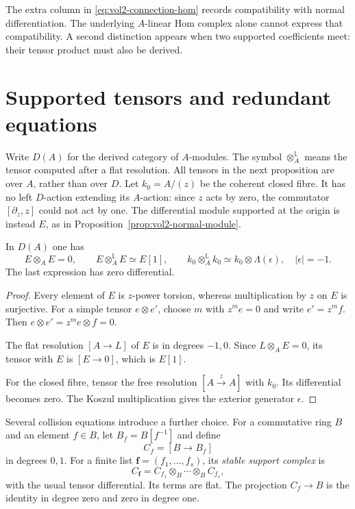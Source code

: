 The extra column in \eqref{eq:vol2-connection-hom} records compatibility
with normal differentiation. The underlying $A$-linear Hom complex
alone cannot express that compatibility. A second distinction appears
when two supported coefficients meet: their tensor product must also
be derived.

\section{Supported tensors and redundant equations}
\label{sec:vol2-supported-tensors}

Write $D(A)$ for the derived category of $A$-modules. The symbol
$\otimes_A^{\mathbb L}$ means the tensor computed after a flat
resolution. All tensors in the next proposition are over $A$, rather
than over $D$. Let $k_0=A/(z)$ be the coherent closed fibre.
It has no left $D$-action extending its $A$-action: since $z$ acts
by zero, the commutator $[\partial_z,z]$ could not act by one.
The differential module supported at the origin is instead $E$,
as in Proposition~\ref{prop:vol2-normal-module}.

\begin{proposition}\label{prop:vol2-supported-self-tensor}
In $D(A)$ one has
\begin{equation}\label{eq:vol2-supported-self-tensor}
 E\otimes_AE=0,\qquad E\otimes_A^{\mathbb L}E\simeq E[1],
 \qquad
 k_0\otimes_A^{\mathbb L}k_0\simeq k_0\otimes\Lambda(\epsilon),
 \quad |\epsilon|=-1.
\end{equation}
The last expression has zero differential.
\end{proposition}

\begin{proof}
Every element of $E$ is $z$-power torsion, whereas multiplication by
$z$ on $E$ is surjective. For a simple tensor $e\otimes e'$,
choose $m$ with $z^me=0$ and write $e'=z^mf$. Then
$e\otimes e'=z^me\otimes f=0$.

The flat resolution $[A\to L]$ of $E$ is in degrees $-1,0$.
Since $L\otimes_AE=0$, its tensor with $E$ is $[E\to0]$,
which is $E[1]$.

For the closed fibre, tensor the free resolution
$[A\xrightarrow{z}A]$ with $k_0$. Its differential becomes zero.
The Koszul multiplication gives the exterior generator $\epsilon$.
\end{proof}

Several collision equations introduce a further choice. For a
commutative ring $B$ and an element $f\in B$, let
$B_f=B[f^{-1}]$ and define
\[
 C_f=[B\longrightarrow B_f]
\]
in degrees $0,1$. For a finite list $\mathbf f=(f_1,\ldots,f_s)$,
its \emph{stable support complex} is
\begin{equation}\label{eq:vol2-stable-support}
 C_{\mathbf f}=C_{f_1}\otimes_B\cdots\otimes_B C_{f_s},
\end{equation}
with the usual tensor differential. Its terms are flat. The
projection $C_f\to B$ is the identity in degree zero and zero
in degree one.

